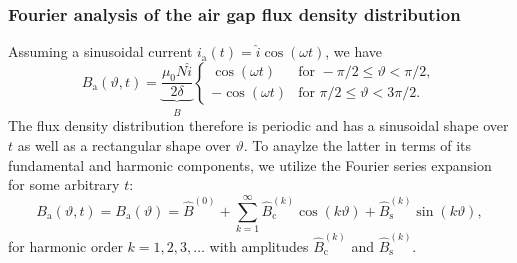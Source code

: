 \begin{frame}
	\frametitle{Fourier analysis of the air gap flux density distribution}
        Assuming a sinusoidal current $i_\mathrm{a}(t) = \hat{i} \cos(\omega t)$, we have
        \begin{equation}
            B_\mathrm{a}(\vartheta, t) = \underbrace{\frac{\mu_0 N \hat{i}}{2\delta}}_{\hat{B}} \begin{cases}
                \cos(\omega t) & \text{for } -\pi/2 \leq \vartheta < \pi/2, \\
                -\cos(\omega t) & \text{for } \pi/2 \leq \vartheta < 3\pi/2.
            \end{cases}
            \label{eq:B_single_phase_coil}
        \end{equation}
        The flux density distribution therefore is periodic and has a sinusoidal shape over $t$ as well as a rectangular shape over $\vartheta$. To anaylze the latter in terms of its fundamental and harmonic components, we utilize the Fourier series expansion for some arbitrary $t$:
        \begin{equation}
            B_\mathrm{a}(\vartheta, t) =B_\mathrm{a}(\vartheta) = \hat{B}^{(0)} + \sum_{k=1}^{\infty} \hat{B}_{\mathrm{c}}^{(k)} \cos(k \vartheta) + \hat{B}_{\mathrm{s}}^{(k)} \sin(k \vartheta),
            \label{eq:fourier_series_B_single_phase_coil}
        \end{equation} 
        for harmonic order $k=1,2,3,\ldots$ with amplitudes $\hat{B}_{\mathrm{c}}^{(k)}$ and $\hat{B}_{\mathrm{s}}^{(k)}$. 
\end{frame}

